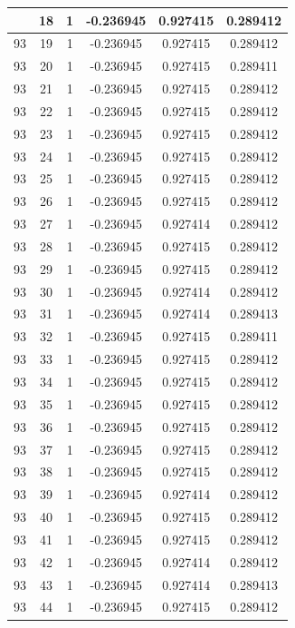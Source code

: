\documentclass[12pt,a4paper]{article}
\numberwithin{equation}{section}
\numberwithin{figure}{section}
\numberwithin{table}{section}
\begin{document}
\begin{longtable}{|c|c|c|c|c|c|}
\pagebreak
93 & 18 & 1 & -0.236945 & 0.927415 & 0.289412 \\ \hline
93 & 19 & 1 & -0.236945 & 0.927415 & 0.289412 \\ \hline
93 & 20 & 1 & -0.236945 & 0.927415 & 0.289411 \\ \hline
93 & 21 & 1 & -0.236945 & 0.927415 & 0.289412 \\ \hline
93 & 22 & 1 & -0.236945 & 0.927415 & 0.289412 \\ \hline
93 & 23 & 1 & -0.236945 & 0.927415 & 0.289412 \\ \hline
93 & 24 & 1 & -0.236945 & 0.927415 & 0.289412 \\ \hline
93 & 25 & 1 & -0.236945 & 0.927415 & 0.289412 \\ \hline
93 & 26 & 1 & -0.236945 & 0.927415 & 0.289412 \\ \hline
93 & 27 & 1 & -0.236945 & 0.927414 & 0.289412 \\ \hline
93 & 28 & 1 & -0.236945 & 0.927415 & 0.289412 \\ \hline
93 & 29 & 1 & -0.236945 & 0.927415 & 0.289412 \\ \hline
93 & 30 & 1 & -0.236945 & 0.927414 & 0.289412 \\ \hline
93 & 31 & 1 & -0.236945 & 0.927414 & 0.289413 \\ \hline
93 & 32 & 1 & -0.236945 & 0.927415 & 0.289411 \\ \hline
93 & 33 & 1 & -0.236945 & 0.927415 & 0.289412 \\ \hline
93 & 34 & 1 & -0.236945 & 0.927415 & 0.289412 \\ \hline
93 & 35 & 1 & -0.236945 & 0.927415 & 0.289412 \\ \hline
93 & 36 & 1 & -0.236945 & 0.927415 & 0.289412 \\ \hline
93 & 37 & 1 & -0.236945 & 0.927415 & 0.289412 \\ \hline
93 & 38 & 1 & -0.236945 & 0.927415 & 0.289412 \\ \hline
93 & 39 & 1 & -0.236945 & 0.927414 & 0.289412 \\ \hline
93 & 40 & 1 & -0.236945 & 0.927415 & 0.289412 \\ \hline
93 & 41 & 1 & -0.236945 & 0.927415 & 0.289412 \\ \hline
93 & 42 & 1 & -0.236945 & 0.927414 & 0.289412 \\ \hline
93 & 43 & 1 & -0.236945 & 0.927414 & 0.289413 \\ \hline
93 & 44 & 1 & -0.236945 & 0.927415 & 0.289412 \\ \hline

\end{longtable}
\end{document}
